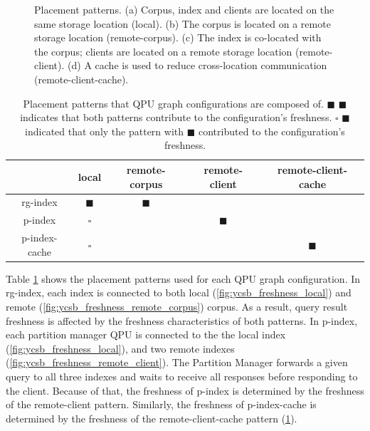 \begin{figure}[H]
\begin{subfigure}{0.24\textwidth}
    \caption{}
    \label{fig:ycsb_freshness_remote_client_cache}
  \end{subfigure}%
  \caption{Placement patterns. (a) Corpus, index and clients are located on the same storage location (local).
  (b) The corpus is located on a remote storage location (remote-corpus). (c) The index is co-located with the corpus;
  clients are located on a remote storage location (remote-client). (d) A cache is used to reduce cross-location communication (remote-client-cache).}
  \label{fig:placement_patterns}
\end{figure}

\begin{table}[H]
\centering
\begin{tabular}{|c||c|c|c|c||}
\hline
& local & remote-corpus & remote-client & remote-client-cache \\
\hline
rg-index & $\blacksquare$ & $\blacksquare$ &  & \\
\hline
p-index & $\square$ & & $\blacksquare$ & \\
\hline
p-index-cache & $\square$ & &  & $\blacksquare$ \\
\hline
\end{tabular}
\caption{Placement patterns that QPU graph configurations are composed of.
$\blacksquare$ $\blacksquare$ indicates that both patterns contribute to the configuration's freshness.
$\square$ $\blacksquare$ indicated that only the pattern with $\blacksquare$ contributed to the configuration's freshness.}
\label{tab:placement_patterns}
\end{table}

Table \ref{tab:placement_patterns} shows the placement patterns used for each QPU graph configuration.
In rg-index, each index is connected to both local (\ref{fig:ycsb_freshness_local}) and remote (\ref{fig:ycsb_freshness_remote_corpus}) corpus.
As a result, query result freshness is affected by the freshness characteristics of both patterns.
In p-index, each partition manager QPU is connected to the the local index (\ref{fig:ycsb_freshness_local}),
and two remote indexes (\ref{fig:ycsb_freshness_remote_client}).
The Partition Manager forwards a given query to all three indexes and waits to receive all responses before responding to
the client.
Because of that, the freshness of p-index is determined by the freshness of the remote-client pattern.
Similarly, the freshness of p-index-cache is determined by the freshness of the remote-client-cache pattern
(\ref{fig:ycsb_freshness_remote_client_cache}).


